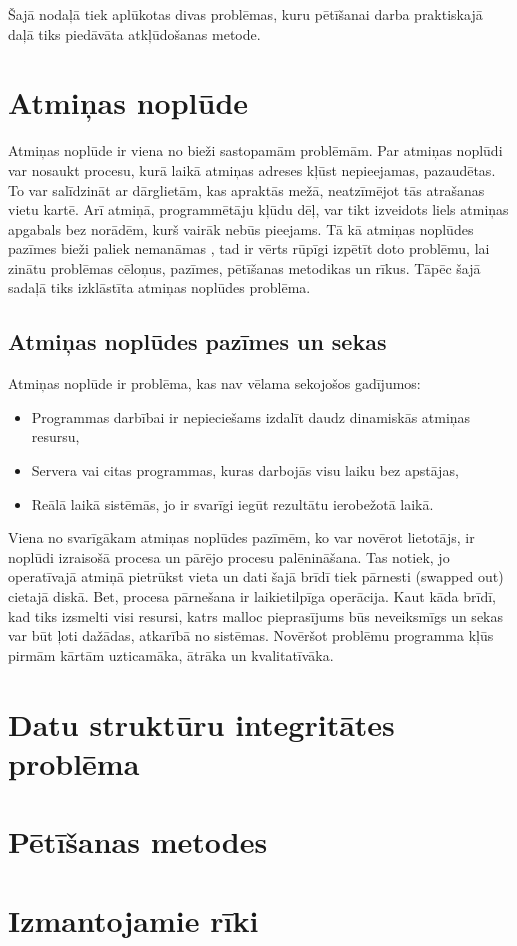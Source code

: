﻿Šajā nodaļā tiek aplūkotas divas problēmas, kuru pētīšanai darba praktiskajā daļā tiks piedāvāta atkļūdošanas metode.

\section{Atmiņas noplūde}
Atmiņas noplūde ir viena no bieži sastopamām problēmām. 
Par atmiņas noplūdi var nosaukt procesu, kurā laikā atmiņas adreses kļūst nepieejamas, pazaudētas. To var salīdzināt ar dārglietām, kas apraktās mežā, neatzīmējot tās atrašanas vietu kartē. 
Arī atmiņā, programmētāju kļūdu dēļ, var tikt izveidots liels atmiņas apgabals bez norādēm, kurš vairāk nebūs pieejams.
Tā kā atmiņas noplūdes pazīmes bieži paliek nemanāmas \cite{surv_of_dist}, tad ir vērts rūpīgi izpētīt doto problēmu, lai zinātu problēmas cēloņus, pazīmes, pētīšanas metodikas un rīkus. 
Tāpēc šajā sadaļā tiks izklāstīta atmiņas noplūdes problēma.






\subsection{Atmiņas noplūdes pazīmes un sekas}

Atmiņas noplūde ir problēma, kas nav vēlama sekojošos gadījumos: 
 
\begin{itemize}
\item { Programmas darbībai ir nepieciešams izdalīt daudz dinamiskās atmiņas resursu, }
\item { Servera vai citas programmas, kuras darbojās visu laiku bez apstājas, }
\item { Reālā laikā sistēmās, jo ir svarīgi iegūt rezultātu ierobežotā laikā. }
\end{itemize}

Viena no svarīgākam atmiņas noplūdes pazīmēm, ko var novērot lietotājs, ir noplūdi izraisošā procesa un pārējo procesu palēnināšana. 
Tas notiek, jo operatīvajā atmiņā pietrūkst vieta un dati šajā brīdī tiek pārnesti (swapped out) cietajā diskā.
Bet, procesa pārnešana ir laikietilpīga operācija. 
Kaut kāda brīdī, kad tiks izsmelti visi resursi, katrs malloc pieprasījums būs neveiksmīgs un sekas var būt ļoti dažādas, atkarībā no sistēmas. 
Novēršot problēmu programma kļūs pirmām kārtām uzticamāka, ātrāka un kvalitatīvāka.

\section{Datu struktūru integritātes problēma}
\section{Pētīšanas metodes}
\section{Izmantojamie rīki}
